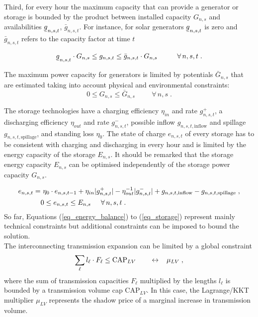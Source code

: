 \documentclass[3p]{elsarticle} %
\newcommand{\ubar}[1]{\text{\b{$#1$}}}
\begin{document}
Third, for every hour the maximum capacity that can provide a generator or storage is bounded by the product between installed capacity $G_{n,s}$ and availabilities $\ubar{g}_{n,s,t}$, $\bar{g}_{n,s,t}$. For instance, for solar generators $\ubar{g}_{n,s,t}$ is zero and $\bar{g}_{n,s,t}$ refers to the capacity factor at time $t$ 

\begin{equation}
\ubar{g}_{n,s,t} \cdot G_{n,s} \leq g_{n,s,t} \leq \bar{g}_{n,s,t} \cdot G_{n,s} \hspace{1cm} \forall\, n,s,t \; . \label{eq_g}
\end{equation}

The maximum power capacity for generators is limited by potentials $\bar{G}_{n,s}$ that are estimated taking into account physical and environmental constraints:
\begin{equation}\label{eq_max_G}
0 \leq G_{n,s}\leq \bar{G}_{n,s} \hspace{1cm} \forall\, n,s \; .
\end{equation}

The storage technologies have a charging efficiency $\eta_{in}$ and rate $g_{n,s,t}^+$, a discharging efficiency $\eta_{out}$ and rate $g_{n,s,t}^-$, possible inflow $g_{n,s,t,\textrm{inflow}}$ and spillage $g_{n,s,t,\textrm{spillage}}$, and standing loss $\eta_0$. The state of charge $e_{n,s,t}$ of every storage has to be consistent with charging and discharging in every hour and is limited by the energy capacity of the storage $E_{n,s}$. It should be remarked that the storage energy capacity $E_{n,s}$ can be optimised independently of the storage power capacity $G_{n,s}$.

\begin{align}
e_{n,s,t} = & \ \eta_0 \cdot e_{n,s,t-1} + \eta_{in} |g_{n,s,t}^+| - \eta_{out}^{-1} |g_{n,s,t}^-| \nonumber + g_{n,s,t,\textrm{inflow}} - g_{n,s,t,\textrm{spillage}} \; , \nonumber \\
& 0  \leq   e_{n,s,t} \leq E_{n,s}   \hspace{0.5cm} \forall\, n,s,t \; . \label{eq_storage}
\end{align}
So far, Equations (\ref{eq_energy_balance}) to (\ref{eq_storage}) represent mainly technical constraints but additional constraints can be imposed to bound the solution.\\

The interconnecting transmission expansion can be limited by a global constraint
\begin{equation}
\sum_{\ell} l_\ell \cdot F_{\ell} \leq  \textrm{CAP}_{LV} \hspace{.7cm} \leftrightarrow \hspace{0.3cm} \mu_{LV} \; ,
\label{eq_cap}
\end{equation}
where the sum of transmission capacities $F_{\ell}$ multiplied by the lengths $l_{\ell}$ is bounded by a transmission volume cap $\textrm{CAP}_{LV}$. In this case, the Lagrange/KKT multiplier $\mu_{LV}$ represents the shadow price of a marginal increase in transmission volume.\\
\end{document}
